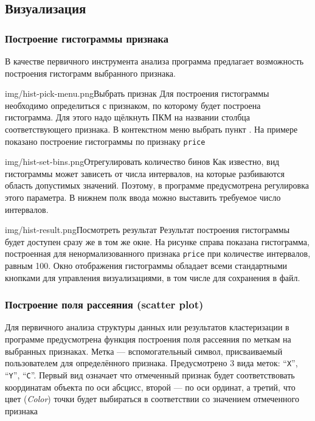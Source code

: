 \documentclass[12pt,tikz]{instruction}
\begin{document}
\newpage
\subsection{Визуализация}
\subsubsection{Построение гистограммы признака}
\label{subsubsec:hist}

В качестве первичного инструмента анализа программа предлагает возможность построения гистограмм выбранного признака.

\begin{steps}
	\begin{ist}{img/hist-pick-menu.png}{Выбрать признак}
		Для построения гистограммы необходимо определиться с признаком, по которому будет построена гистограмма. Для этого надо щёлкнуть ПКМ на названии столбца соответствующего признака. В контекстном меню выбрать пункт . На примере показано построение гистограммы по признаку \texttt{price}
	\end{ist}
	\begin{ist}{img/hist-set-bins.png}{Отрегулировать количество бинов}
		Как известно, вид гистограммы может зависеть от числа интервалов, на которые разбиваются область допустимых значений. Поэтому, в программе предусмотрена регулировка этого параметра. В нижнем полк ввода можно выставить требуемое число интервалов.
	\end{ist}
	\begin{ist}{img/hist-result.png}{Посмотреть результат}
		Результат построения гистограммы будет доступен сразу же в том же окне. На рисунке справа показана гистограмма, построенная для ненормализованного признака \texttt{price} при количестве интервалов, равным 100. Окно отображения гистограммы обладает всеми стандартными кнопками для управления визуализациями, в том числе для сохранения в файл.
	\end{ist}		
\end{steps}	


\newpage
\subsubsection{Построение поля рассеяния (scatter plot)}
\label{subsubsec:scatterplot}

Для первичного анализа структуры данных или результатов кластеризации в программе предусмотрена функция построения поля рассеяния по меткам на выбранных признаках. Метка --- вспомогательный символ, присваиваемый пользователем для  определённого признака.  Предусмотрено 3 вида меток: ``\texttt{X}'', ``\texttt{Y}'', ``\texttt{C}''. Первый вид означает что отмеченный признак будет соответствовать координатам объекта по оси абсцисс, второй --- по оси ординат, а третий, что цвет (\textit{Color}) точки будет выбираться в соответствии со значением отмеченного признака
\end{document}
